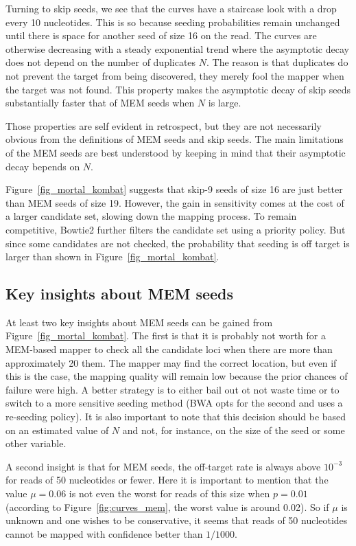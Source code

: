 \documentclass{article}
\begin{document}
Turning to skip seeds, we see that the curves have a staircase look with a
drop every 10 nucleotides. This is so because seeding probabilities remain
unchanged until there is space for another seed of size 16 on the read.
The curves are otherwise decreasing with a steady exponential trend where
the asymptotic decay does not depend on the number of duplicates $N$. The
reason is that duplicates do not prevent the target from being discovered,
they merely fool the mapper when the target was not found. This property
makes the asymptotic decay of skip seeds substantially faster that of MEM
seeds when $N$ is large.

Those properties are self evident in retrospect, but they are not
necessarily obvious from the definitions of MEM seeds and skip seeds.
The main limitations of the MEM seeds are best understood by keeping in
mind that their asymptotic decay bepends on $N$.

Figure~\ref{fig_mortal_kombat} suggests that skip-9 seeds of size 16 are
just better than MEM seeds of size 19. However, the gain in sensitivity
comes at the cost of a larger candidate set, slowing down the mapping
process. To remain competitive, Bowtie2 further filters the candidate set
using a priority policy. But since some candidates are not checked, the
probability that seeding is off target is larger than shown in
Figure~\ref{fig_mortal_kombat}.

\subsection{Key insights about MEM seeds}

At least two key insights about MEM seeds can be gained from
Figure~\ref{fig_mortal_kombat}. The first is that it is probably not worth
for a MEM-based mapper to check all the candidate loci when there are more
than approximately 20 them. The mapper may find the correct location, but
even if this is the case, the mapping quality will remain low because the
prior chances of failure were high. A better strategy is to either bail
out ot not waste time or to switch to a more sensitive seeding method (BWA
opts for the second and uses a re-seeding policy). It is also important
to note that this decision should be based on an estimated value of $N$
and not, for instance, on the size of the seed or some other variable.

A second insight is that for MEM seeds, the off-target rate is always
above $10^{-3}$ for reads of 50 nucleotides or fewer. Here it is important
to mention that the value $\mu=0.06$ is not even the worst for reads of
this size when $p=0.01$ (according to Figure~\ref{fig:curves_mem}, the
worst value is around 0.02). So if $\mu$ is unknown and one wishes to be
conservative, it seems that reads of 50 nucleotides cannot be mapped with
confidence better than $1/1000$.
\end{document}
